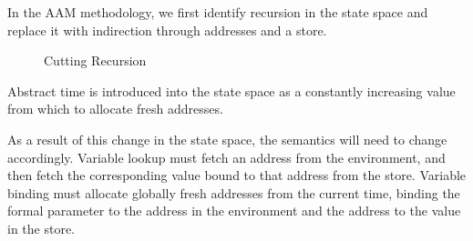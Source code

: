 In the AAM methodology, we first identify recursion in the state space and
replace it with indirection through addresses and a store.
%
\begin{figure}[H]
\caption*{Cutting Recursion}
\end{figure} 
\noindent
%
Abstract time is introduced into the state space as a constantly increasing
value from which to allocate fresh addresses.


As a result of this change in the state space, the semantics will need to
change accordingly.
%
Variable lookup must fetch an address from the environment, and then fetch the
corresponding value bound to that address from the store.
%
Variable binding must allocate globally fresh addresses from the current time,
binding the formal parameter to the address in the environment and the address
to the value in the store.
